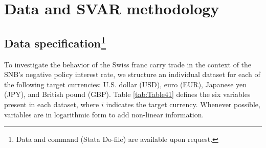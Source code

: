 \documentclass[a4paper, twoside]{templates/ociamthesis}
\begin{document}
\hypertarget{fourtwo}{%
\section{Data and SVAR methodology}\label{fourtwo}}

\hypertarget{fourtwoone}{%
\subsection[Data specification]{\texorpdfstring{Data specification\footnote{Data and command (Stata Do-file) are available upon request.}}{Data specification}}\label{fourtwoone}}

To investigate the behavior of the Swiss franc carry trade in the context of the SNB's negative policy interest rate, we structure an individual dataset for each of the following target currencies: U.S. dollar (USD), euro (EUR), Japanese yen (JPY), and British pound (GBP). Table \ref{tab:Table41} defines the six variables present in each dataset, where \(i\) indicates the target currency. Whenever possible, variables are in logarithmic form to add non-linear information.
\end{document}

